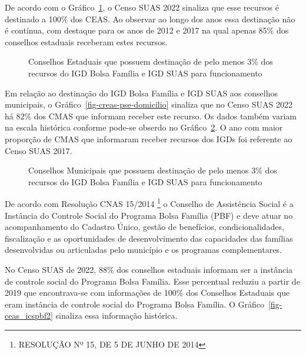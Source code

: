 \documentclass[
  letterpaper,
  DIV=11,
  numbers=noendperiod]{scrreprt}
\begin{document}
De acordo com o Gráfico~\ref{fig-ceas_igd}, o Censo SUAS 2022 sinaliza
que esse recursos é destinado a 100\% dos CEAS. Ao observar ao longo dos
anos essa destinação não é contínua, com destaque para os anos de 2012 e
2017 na qual apenas 85\% dos conselhos estaduais receberam estes
recursos.

\begin{figure}


\caption{\label{fig-ceas_igd}Conselhos Estaduais que possuem destinação
de pelo menos 3\% dos recursos do IGD Bolsa Família e IGD SUAS para
funcionamento}

\end{figure}%

Em relação ao destinação do IGD Bolsa Família e IGD SUAS aos conselhos
municipais, o Gráfico~\ref{fig-creas-pse-domicilio} sinaliza que no
Censo SUAS 2022 há 82\% dos CMAS que informam receber este recurso. Os
dados também variam na escala histórica conforme pode-se obserdo no
Gráfico~\ref{fig-cmas_igd}. O ano com maior proporção de CMAS que
informaram receber recursos dos IGDs foi referente ao Censo SUAS 2017.

\begin{figure}


\caption{\label{fig-cmas_igd}Conselhos Municipais que possuem destinação
de pelo menos 3\% dos recursos do IGD Bolsa Família e IGD SUAS para
funcionamento}

\end{figure}%

De acordo com Resolução CNAS 15/2014 \footnote{RESOLUÇÃO Nº 15, DE 5 DE
  JUNHO DE 2014} o Conselho de Assistência Social é a Instância do
Controle Social do Programa Bolsa Família (PBF) e deve atuar no
acompanhamento do Cadastro Único, gestão de benefícios,
condicionalidades, fiscalização e as oportunidades de desenvolvimento
das capacidades das famílias desenvolvidas ou articuladas pelo município
e os programas complementares.

No Censo SUAS de 2022, 88\% dos conselhos estaduais informam ser a
instância de controle social do Programa Bolsa Família. Esse percentual
reduziu a partir de 2019 que encontrava-se com informações de 100\% dos
Conselhos Estaduais que eram instância de controle social do Programa
Bolsa Família. O Gráfico~\ref{fig-ceas_icspbf2} sinaliza essa informação
histórica.
\end{document}
